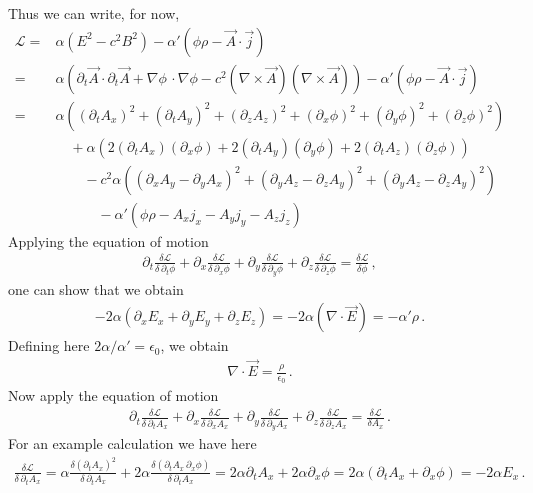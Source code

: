 \documentclass[11pt, onesided]{book}
\theoremstyle{break}
\theoremstyle{break}
\newcommand{\pd}{\partial}
\begin{document}
Thus we can write, for now,
\begin{align*}
\mathcal{L} 
=& \alpha(E^2-c^2 B^2) - \alpha'(\phi \rho - \vec{A}\cdot \vec{j}) \tag{4.6}\\
=& \alpha(\pd_t \vec{A} \cdot \pd_t \vec{A} + \nabla \phi \, \cdot \nabla \phi - c^2(\nabla \times \vec{A})(\nabla \times \vec{A}))- \alpha'(\phi \rho - \vec{A}\cdot \vec{j})\\
=&\alpha\left( (\pd_t A_x)^2 + (\pd_t A_y)^2 + (\pd_z A_z)^2 
+ (\pd_x\phi)^2
 + (\pd_y\phi)^2
  + (\pd_z\phi)^2\right)\\
&{}\quad +\alpha\left(
2(\pd_tA_x)(\pd_x \phi)
 + 2(\pd_tA_y)(\pd_y \phi)
  + 2(\pd_tA_z)(\pd_z \phi)
\right)\\
&{}\quad\quad -c^2\alpha\left(
(\pd_xA_y - \pd_y A_x)^2 + 
(\pd_yA_z - \pd_z A_y)^2 + 
(\pd_yA_z - \pd_z A_y)^2\right)\\
&{}\quad\quad\quad -\alpha'\left(\phi \rho -A_xj_x - A_y j_y - A_zj_z\right)
\end{align*}
\setcounter{equation}{6}
Applying the equation of motion
\begin{align*}
\pd_t \frac{\delta \mathcal{L}}{\delta\, \pd_t \phi} + \pd_x \frac{\delta\mathcal{L}}{\delta\, \pd_x \phi}
+\pd_y \frac{\delta\mathcal{L}}{\delta\, \pd_y \phi}
+\pd_z \frac{\delta\mathcal{L}}{\delta\, \pd_z \phi} = \frac{\delta \mathcal{L}}{\delta \phi}\,,
\end{align*}
one can show that we obtain
\begin{align*}
-2\alpha(\pd_x E_x + \pd_y E_y + \pd_z E_z) = -2\alpha (\nabla \cdot \vec{E}) = -\alpha' \rho\,.
\end{align*}
Defining here $2\alpha/\alpha' = \epsilon_0$, we obtain
\begin{align*}
\nabla \cdot \vec{E} = \frac{\rho}{\epsilon_0}\,.
\end{align*}
Now apply the equation of motion 
\begin{align*}
\pd_t \frac{\delta \mathcal{L}}{\delta\, \pd_t A_x} + \pd_x \frac{\delta\mathcal{L}}{\delta\, \pd_x A_x}
+\pd_y \frac{\delta\mathcal{L}}{\delta\, \pd_y A_x}
+\pd_z \frac{\delta\mathcal{L}}{\delta\, \pd_z A_x} 
= \frac{\delta \mathcal{L}}{\delta A_x}\,.
\end{align*}
For an example calculation we have here
\begin{align*}
\frac{\delta \mathcal{L}}{\delta \, \pd_t A_x} = \alpha \frac{\delta (\pd_t A_x)^2}{\delta\, \pd_t A_x} + 2\alpha \frac{\delta(\pd_t A_x \,\pd_x \phi)}{\delta\, \pd_t A_x} = 2\alpha \pd_tA_x + 2\alpha \pd_x \phi = 2\alpha(\pd_tA_x + \pd_x \phi) = -2\alpha E_x\,.
\end{align*}
\end{document}
